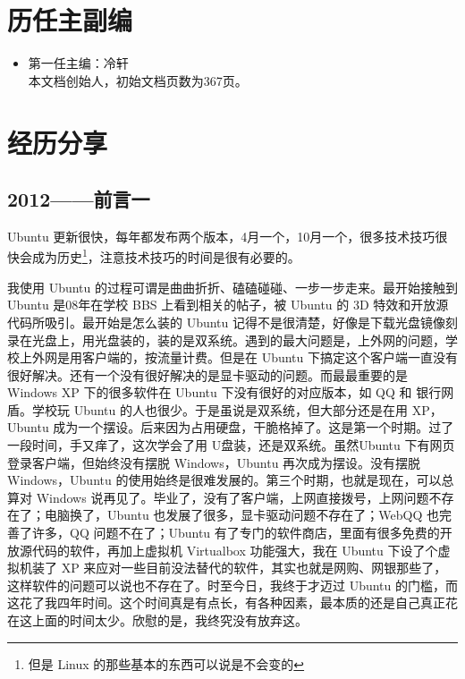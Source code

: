 \documentclass[cn,11pt,chinese,twoside]{elegantbook}
\begin{document}
\section*{历任主副编}
\begin{itemize}
\item 第一任主编：冷轩\\
本文档创始人，初始文档页数为367页。
\end{itemize}



\section*{经历分享}
\subsection*{2012——前言一}
    Ubuntu 更新很快，每年都发布两个版本，4月一个，10月一个，很多技术技巧很快会成为历史\footnote{但是 Linux 的那些基本的东西可以说是不会变的}，注意技术技巧的时间是很有必要的。

    我使用 Ubuntu 的过程可谓是曲曲折折、磕磕碰碰、一步一步走来。最开始接触到 Ubuntu 是08年在学校 BBS 上看到相关的帖子，被 Ubuntu 的 3D 特效和开放源代码所吸引。最开始是怎么装的 Ubuntu 记得不是很清楚，好像是下载光盘镜像刻录在光盘上，用光盘装的，装的是双系统。遇到的最大问题是，上外网的问题，学校上外网是用客户端的，按流量计费。但是在 Ubuntu 下搞定这个客户端一直没有很好解决。还有一个没有很好解决的是显卡驱动的问题。而最最重要的是 Windows  XP 下的很多软件在 Ubuntu 下没有很好的对应版本，如 QQ 和 银行网盾。学校玩 Ubuntu 的人也很少。于是虽说是双系统，但大部分还是在用 XP， Ubuntu 成为一个摆设。后来因为占用硬盘，干脆格掉了。这是第一个时期。过了一段时间，手又痒了，这次学会了用 U盘装，还是双系统。虽然Ubuntu 下有网页登录客户端，但始终没有摆脱 Windows，Ubuntu 再次成为摆设。没有摆脱Windows，Ubuntu 的使用始终是很难发展的。第三个时期，也就是现在，可以总算对 Windows 说再见了。毕业了，没有了客户端，上网直接拨号，上网问题不存在了；电脑换了，Ubuntu 也发展了很多，显卡驱动问题不存在了；WebQQ 也完善了许多，QQ 问题不在了；Ubuntu 有了专门的软件商店，里面有很多免费的开放源代码的软件，再加上虚拟机 Virtualbox 功能强大，我在 Ubuntu 下设了个虚拟机装了 XP 来应对一些目前没法替代的软件，其实也就是网购、网银那些了，这样软件的问题可以说也不存在了。时至今日，我终于才迈过 Ubuntu 的门槛，而这花了我四年时间。这个时间真是有点长，有各种因素，最本质的还是自己真正花在这上面的时间太少。欣慰的是，我终究没有放弃这。
    
\end{document}
